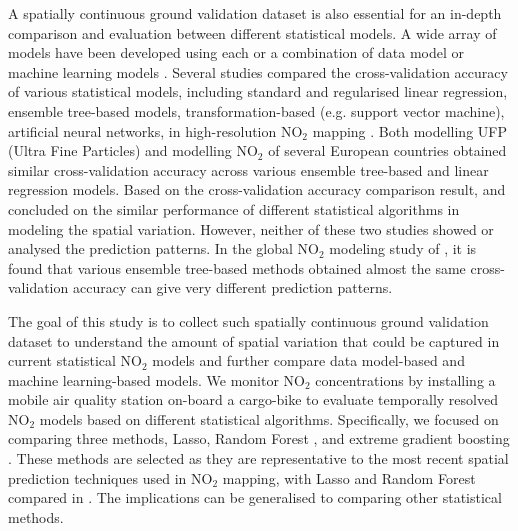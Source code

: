 \documentclass{article}
\begin{document}
A spatially continuous ground validation dataset is also essential for an in-depth comparison and evaluation between different statistical models. A wide array of models have been developed using each or a combination of data model \cite{briggs2000regression} or machine learning models \citep{kees2020satelliteML}. Several studies compared the cross-validation accuracy of various statistical models, including standard and regularised linear regression, ensemble tree-based models, transformation-based (e.g. support vector machine), artificial neural networks, in high-resolution NO$_2$ mapping \citep{chen2019comparison, kerckhoffs2019performance, luglobal}. Both \cite{kerckhoffs2019performance} modelling UFP (Ultra Fine Particles) and \cite{chen2019comparison} modelling NO$_2$ of several European countries obtained similar cross-validation accuracy across various ensemble tree-based and linear regression models. Based on the cross-validation accuracy comparison result, \cite{chen2019comparison} and \cite{kerckhoffs2019performance} concluded on the similar performance of different statistical algorithms in modeling the spatial variation. However, neither of these two studies showed or analysed the prediction patterns. In the global NO$_2$ modeling study of \cite{luglobal}, it is found that various ensemble tree-based methods obtained almost the same cross-validation accuracy can give very different prediction patterns.  

The goal of this study is to collect such spatially continuous ground validation dataset to understand the amount of spatial variation that could be captured in current statistical NO$_2$ models and further compare data model-based and machine learning-based models. We monitor NO$_2$ concentrations by installing a mobile air quality station on-board a cargo-bike to evaluate temporally resolved NO$_2$ models based on different statistical algorithms. Specifically, we focused on comparing three methods, Lasso\citep{lasso}, Random Forest \citep[RF,][]{breiman2001random}, and extreme gradient boosting \citep[XGBoost, XGB,][]{xgboost}. These methods are selected as they are representative to the most recent spatial prediction techniques used in NO$_2$ mapping, with Lasso and Random Forest compared in \cite{chen2019comparison, kerckhoffs2019performance, luglobal}. The implications can be generalised to comparing other statistical methods.   %
\end{document}
